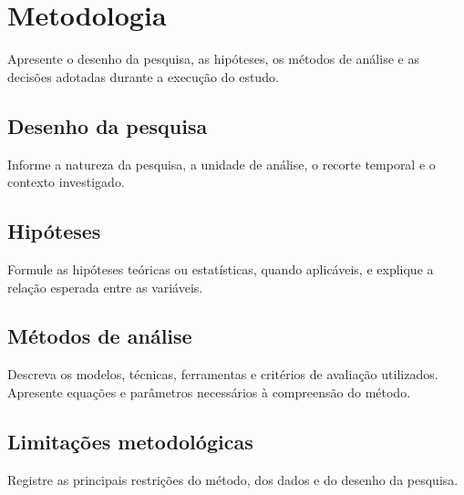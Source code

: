 \chapter{Metodologia}

Apresente o desenho da pesquisa, as hipóteses, os métodos de análise e as
decisões adotadas durante a execução do estudo.

\section{Desenho da pesquisa}

Informe a natureza da pesquisa, a unidade de análise, o recorte temporal e o
contexto investigado.

\section{Hipóteses}

Formule as hipóteses teóricas ou estatísticas, quando aplicáveis, e explique a
relação esperada entre as variáveis.

\section{Métodos de análise}

Descreva os modelos, técnicas, ferramentas e critérios de avaliação utilizados.
Apresente equações e parâmetros necessários à compreensão do método.


\section{Limitações metodológicas}

Registre as principais restrições do método, dos dados e do desenho da pesquisa.

